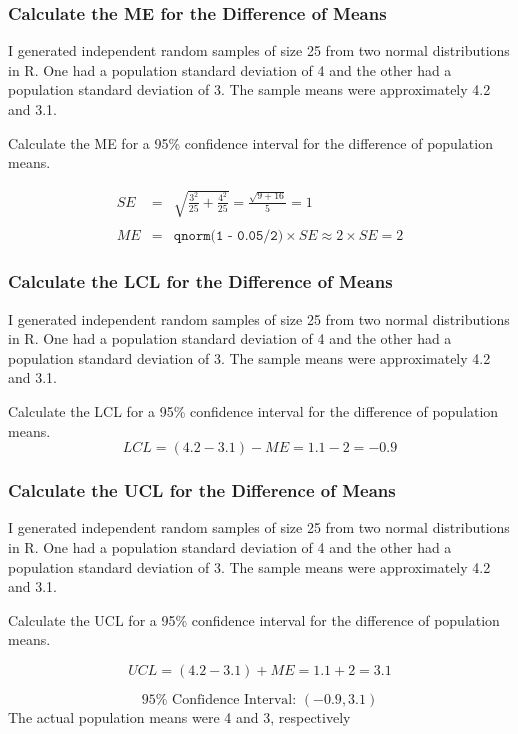 \documentclass{beamer}
\begin{document}
\begin{frame}
\frametitle{Calculate the ME for the Difference of Means }
I generated independent random samples of size 25 from two normal distributions in R. One had a population standard deviation of 4 and the other had a population standard deviation of 3. The sample means were approximately 4.2 and 3.1.

\vspace{1em}
\alert{Calculate the ME for a 95\% confidence interval for the difference of population means.}

\pause
\begin{eqnarray*}
	SE &=& \sqrt{\frac{3^2}{25} + \frac{4^2}{25}} = \frac{\sqrt{9 + 16}}{5} = 1\\  \\
	ME &=& \texttt{qnorm(1 - 0.05/2)} \times SE \approx 2 \times SE = 2
\end{eqnarray*}

\end{frame}

\begin{frame}
\frametitle{Calculate the LCL for the Difference of Means }
I generated independent random samples of size 25 from two normal distributions in R. One had a population standard deviation of 4 and the other had a population standard deviation of 3. The sample means were approximately 4.2 and 3.1.

\vspace{1em}
\alert{Calculate the LCL for a 95\% confidence interval for the difference of population means.}
\pause
$$LCL = (4.2 - 3.1) - ME = 1.1 - 2 = -0.9$$
\end{frame}

\begin{frame}
\frametitle{Calculate the UCL for the Difference of Means }
I generated independent random samples of size 25 from two normal distributions in R. One had a population standard deviation of 4 and the other had a population standard deviation of 3. The sample means were approximately 4.2 and 3.1.

\vspace{1em}
\alert{Calculate the UCL for a 95\% confidence interval for the difference of population means.}\pause

$$UCL = (4.2 - 3.1) + ME =1.1 + 2 = 3.1$$

\pause

\alert{$$\boxed{95\% \mbox{ Confidence Interval: } (-0.9, 3.1)}$$} \pause
The actual population means were 4 and 3, respectively
\end{frame}
\end{document}
